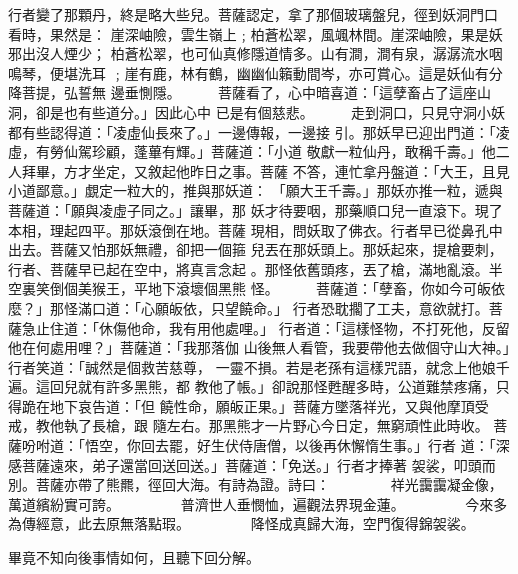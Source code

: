 \begin{pinyinscope}
{行者變了那顆丹，終是略大些兒。菩薩認定，拿了那個玻璃盤兒，徑到妖洞門口
看時，果然是：
崖深岫險，雲生嶺上﹔柏蒼松翠，風颯林間。崖深岫險，果是妖邪出沒人煙少；
柏蒼松翠，也可仙真修隱道情多。山有澗，澗有泉，潺潺流水咽鳴琴，便堪洗耳
﹔崖有鹿，林有鶴，幽幽仙籟動間岑，亦可賞心。這是妖仙有分降菩提，弘誓無
邊垂惻隱。
　　
菩薩看了，心中暗喜道：「這孽畜占了這座山洞，卻是也有些道分。」因此心中
已是有個慈悲。
　　
走到洞口，只見守洞小妖都有些認得道：「凌虛仙長來了。」一邊傳報，一邊接
引。那妖早已迎出門道：「凌虛，有勞仙駕珍顧，蓬蓽有輝。」菩薩道：「小道
敬獻一粒仙丹，敢稱千壽。」他二人拜畢，方才坐定，又敘起他昨日之事。菩薩
不答，連忙拿丹盤道：「大王，且見小道鄙意。」覷定一粒大的，推與那妖道：
「願大王千壽。」那妖亦推一粒，遞與菩薩道：「願與凌虛子同之。」讓畢，那
妖才待要咽，那藥順口兒一直滾下。現了本相，理起四平。那妖滾倒在地。菩薩
現相，問妖取了佛衣。行者早已從鼻孔中出去。菩薩又怕那妖無禮，卻把一個箍
兒丟在那妖頭上。那妖起來，提槍要刺，行者、菩薩早已起在空中，將真言念起
。那怪依舊頭疼，丟了槍，滿地亂滾。半空裏笑倒個美猴王，平地下滾壞個黑熊
怪。
　　
菩薩道：「孽畜，你如今可皈依麼？」那怪滿口道：「心願皈依，只望饒命。」
行者恐耽擱了工夫，意欲就打。菩薩急止住道：「休傷他命，我有用他處哩。」
行者道：「這樣怪物，不打死他，反留他在何處用哩？」菩薩道：「我那落伽
山後無人看管，我要帶他去做個守山大神。」行者笑道：「誠然是個救苦慈尊，
一靈不損。若是老孫有這樣咒語，就念上他娘千遍。這回兒就有許多黑熊，都
教他了帳。」卻說那怪甦醒多時，公道難禁疼痛，只得跪在地下哀告道：「但
饒性命，願皈正果。」菩薩方墜落祥光，又與他摩頂受戒，教他執了長槍，跟
隨左右。那黑熊才一片野心今日定，無窮頑性此時收。
菩薩吩咐道：「悟空，你回去罷，好生伏侍唐僧，以後再休懈惰生事。」行者
道：「深感菩薩遠來，弟子還當回送回送。」菩薩道：「免送。」行者才捧著
袈裟，叩頭而別。菩薩亦帶了熊羆，徑回大海。有詩為證。詩曰：
　　　　祥光靄靄凝金像，萬道繽紛實可誇。
　　　　普濟世人垂憫恤，遍觀法界現金蓮。
　　　　今來多為傳經意，此去原無落點瑕。
　　　　降怪成真歸大海，空門復得錦袈裟。

    畢竟不知向後事情如何，且聽下回分解。





}
\end{pinyinscope}
